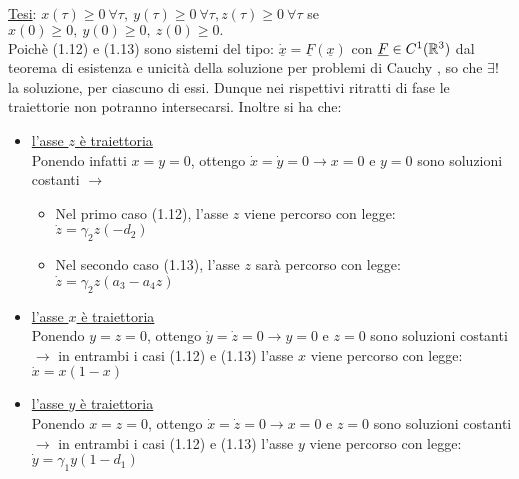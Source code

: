 \documentclass[12pt,oneside]{report}
\begin{document}
\noindent
\underline{Tesi}:
$ x(\tau)\ge 0 \ \forall \tau , \  y(\tau) \ge 0 \ \forall \tau , z(\tau)\ge 0 \ \forall \tau $  se  $x(0)\ge 0, \ y(0)\ge 0, \ z(0)\ge 0 .$ \\


\noindent
Poichè %
(1.12) e (1.13)  sono sistemi del tipo:
$ \dot{\underline{x}}=\underline{F}(\underline{x})$ con $\underline{F}\in C^1(\mathbb{R}^3) \\ $
\noindent
dal teorema di esistenza e unicità della soluzione per problemi di Cauchy \cite{6}, so che $ \exists!$ la soluzione, per ciascuno di essi. 
Dunque nei rispettivi ritratti di fase le traiettorie non potranno intersecarsi. Inoltre si ha che:



\begin{itemize}
    \item \underline{l'asse $z$ è traiettoria} \\
    Ponendo infatti $x=y=0$, ottengo $\dot{x}=\dot{y}=0 \longrightarrow x=0$ e $y=0 $ sono soluzioni costanti  $\longrightarrow $ 
       \begin{itemize}
           \item Nel primo caso (1.12), l'asse $z$ viene percorso con legge: \\$\dot{z}=\gamma_2z(-d_2)  $
        \item Nel secondo caso (1.13), l'asse $z$ sarà percorso con legge:\\
           $\dot{z}=\gamma_2z(a_3-a_4z)$
        \end{itemize}


      \item \underline{l'asse $x$ è traiettoria} \\
       Ponendo $y=z=0$, ottengo $\dot{y}=\dot{z}=0 \longrightarrow y=0$ e $z=0$ sono soluzioni costanti  $\longrightarrow$ in entrambi i casi (1.12) e (1.13) l'asse $x$ viene percorso con legge: $\dot{x}=x(1-x)$
       
        \item \underline{l'asse $y$ è traiettoria} \\
       Ponendo $x=z=0$, ottengo $\dot{x}=\dot{z}=0 \longrightarrow x=0$ e $z=0$ sono soluzioni costanti  $\longrightarrow $ in entrambi i casi (1.12) e (1.13) l'asse $y$ viene percorso con legge: $\dot{y}=\gamma_1y(1-d_1)  $
    
\end{itemize}\\
\end{document}
